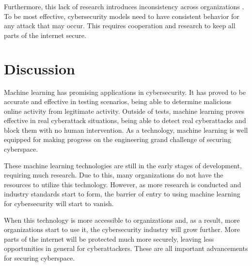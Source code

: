 Furthermore, this lack of research introduces inconsistency across organizations \cite{grandchallenge2019}.
To be most effective, cybersecurity models need to have consistent behavior for any attack that may occur.
This requires cooperation and research to keep all parts of the internet secure.

\section{Discussion}
Machine learning has promising applications in cybersecurity.
It has proved to be accurate and effective in testing scenarios, being able to determine malicious online activity from legitimate activity.
Outside of tests, machine learning proves effective in real cyberattack situations, being able to detect real cyberattacks and block them with no human intervention.
As a technology, machine learning is well equipped for making progress on the engineering grand challenge of securing cyberspace.

These machine learning technologies are still in the early stages of development, requiring much research.
Due to this, many organizations do not have the resources to utilize this technology.
However, as more research is conducted and industry standards start to form, the barrier of entry to using machine learning for cybersecurity will start to vanish.

When this technology is more accessible to organizations and, as a result, more organizations start to use it, the cybersecurity industry will grow further.
More parts of the internet will be protected much more securely, leaving less opportunities in general for cyberattackers.
These are all important advancements for securing cyberspace.
